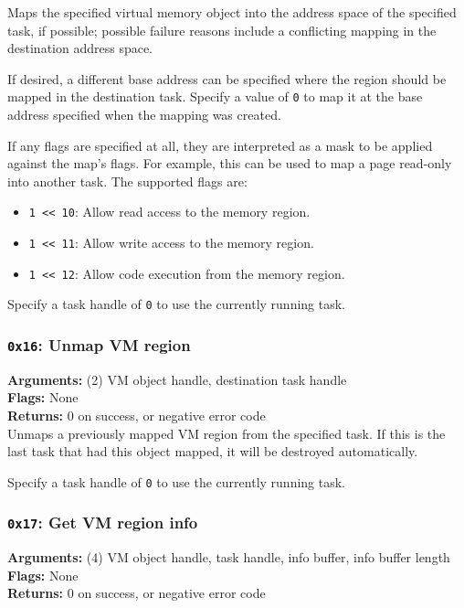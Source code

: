 \documentclass[11pt]{article}
\begin{document}
Maps the specified virtual memory object into the address space of the specified task, if possible; possible failure reasons include a conflicting mapping in the destination address space.

If desired, a different base address can be specified where the region should be mapped in the destination task. Specify a value of \texttt{0} to map it at the base address specified when the mapping was created.

If any flags are specified at all, they are interpreted as a mask to be applied against the map's flags. For example, this can be used to map a page read-only into another task. The supported flags are:

\begin{itemize}
\item \texttt{1 << 10}: Allow read access to the memory region.
\item \texttt{1 << 11}: Allow write access to the memory region.
\item \texttt{1 << 12}: Allow code execution from the memory region.
\end{itemize}

Specify a task handle of \texttt{0} to use the currently running task.

\subsubsection{{\tt 0x16}: Unmap VM region}
\textbf{Arguments:} (2) VM object handle, destination task handle \\
\textbf{Flags:} None \\
\textbf{Returns:} 0 on success, or negative error code \\

Unmaps a previously mapped VM region from the specified task. If this is the last task that had this object mapped, it will be destroyed automatically.

Specify a task handle of \texttt{0} to use the currently running task.

\subsubsection{{\tt 0x17}: Get VM region info}
\textbf{Arguments:} (4) VM object handle, task handle, info buffer, info buffer length \\
\textbf{Flags:} None \\
\textbf{Returns:} 0 on success, or negative error code \\
\end{document}
